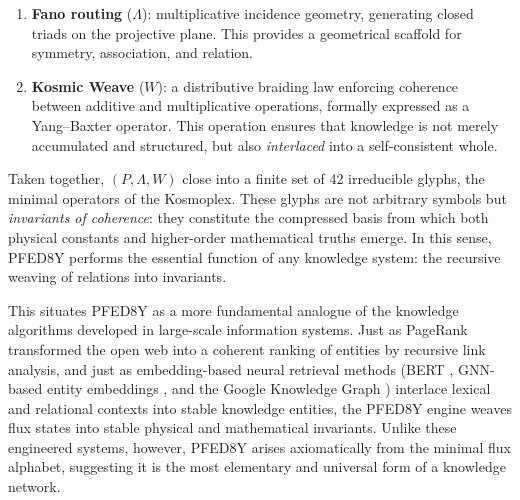 \documentclass[pdflatex,sn-mathphys-num]{sn-jnl}
\theoremstyle{thmstyleone}
\theoremstyle{thmstyletwo}
\theoremstyle{thmstylethree}
\begin{document}
\begin{appendices}
\begin{enumerate}
    \item \textbf{Fano routing} ($\Lambda$): multiplicative incidence geometry,
    generating closed triads on the projective plane. This provides a geometrical
    scaffold for symmetry, association, and relation.

    \item \textbf{Kosmic Weave} ($W$): a distributive braiding law enforcing
    coherence between additive and multiplicative operations, formally expressed
    as a Yang--Baxter operator. This operation ensures that knowledge is not merely
    accumulated and structured, but also \emph{interlaced} into a self-consistent
    whole.
\end{enumerate}

Taken together, $(P,\Lambda,W)$ close into a finite set of 42 irreducible glyphs,
the minimal operators of the Kosmoplex. These glyphs are not arbitrary symbols
but \emph{invariants of coherence}: they constitute the compressed basis from
which both physical constants and higher-order mathematical truths emerge.
In this sense, PFED8Y performs the essential function of any knowledge system:
the recursive weaving of relations into invariants.

This situates PFED8Y as a more fundamental analogue of the knowledge algorithms
developed in large-scale information systems. Just as PageRank \cite{page1999}
transformed the open web into a coherent ranking of entities by recursive link
analysis, and just as embedding-based neural retrieval methods (BERT
\cite{devlin2019}, GNN-based entity embeddings \cite{hamilton2017}, and the
Google Knowledge Graph \cite{singhal2012}) interlace lexical and relational
contexts into stable knowledge entities, the PFED8Y engine weaves flux states
into stable physical and mathematical invariants. Unlike these engineered
systems, however, PFED8Y arises axiomatically from the minimal flux alphabet,
suggesting it is the most elementary and universal form of a knowledge network.


\end{appendices}
\end{document}
